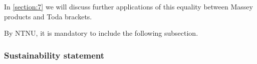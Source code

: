 In \autoref{section:7} we will discuss further applications of this equality between Massey products and Toda brackets.

By NTNU, it is mandatory to include the following subsection.
\subsubsection{Sustainability statement}

